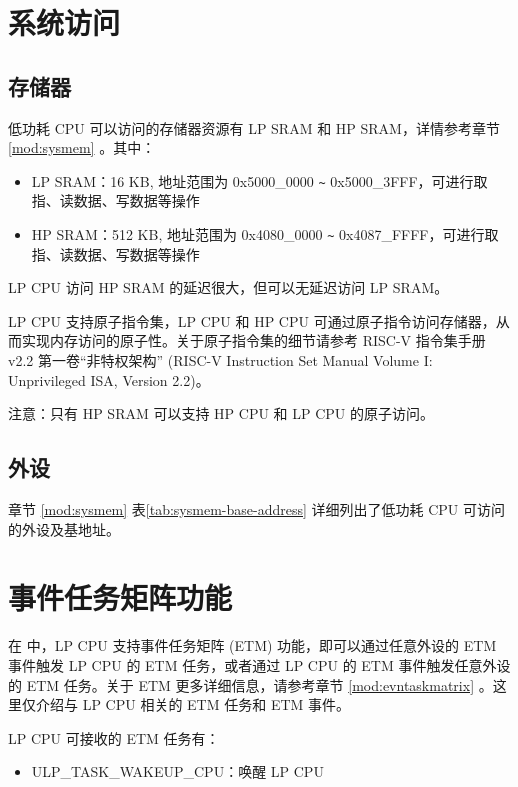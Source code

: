 \documentclass[main\_\_CN.tex]{subfiles}
\begin{document}
\section{系统访问}


\subsection{存储器}

\chipname{} 低功耗 CPU 可以访问的存储器资源有 LP SRAM 和 HP SRAM，详情参考章节 \ref{mod:sysmem} \textit{}。其中：
\begin{itemize}
    \item LP SRAM：16 KB, 地址范围为 0x5000\_0000 \verb+~+ 0x5000\_3FFF，可进行取指、读数据、写数据等操作
    \item HP SRAM：512 KB, 地址范围为 0x4080\_0000 \verb+~+ 0x4087\_FFFF，可进行取指、读数据、写数据等操作
\end{itemize}

\begin{tiplisting}
LP CPU 访问 HP SRAM 的延迟很大，但可以无延迟访问 LP SRAM。
\end{tiplisting}

LP CPU 支持原子指令集，LP CPU 和 HP CPU 可通过原子指令访问存储器，从而实现内存访问的原子性。关于原子指令集的细节请参考 RISC-V 指令集手册 v2.2 第一卷“非特权架构” (RISC-V Instruction Set Manual Volume I: Unprivileged ISA, Version 2.2)。

注意：只有 HP SRAM 可以支持 HP CPU 和 LP CPU 的原子访问。

\subsection{外设}

章节 \ref{mod:sysmem} \textit{} 表\ref{tab:sysmem-base-address} 详细列出了低功耗 CPU 可访问的外设及基地址。

\section{事件任务矩阵功能}
在 \chipname{} 中，LP CPU 支持事件任务矩阵 (ETM) 功能，即可以通过任意外设的 ETM 事件触发 LP CPU 的 ETM 任务，或者通过 LP CPU 的 ETM 事件触发任意外设的 ETM 任务。关于 ETM 更多详细信息，请参考章节 \ref{mod:evntaskmatrix} 。这里仅介绍与 LP CPU 相关的 ETM 任务和 ETM 事件。

LP CPU 可接收的 ETM 任务有：

\begin{itemize}
    \item ULP\_TASK\_WAKEUP\_CPU：唤醒 LP CPU
\end{itemize}
\end{document}

